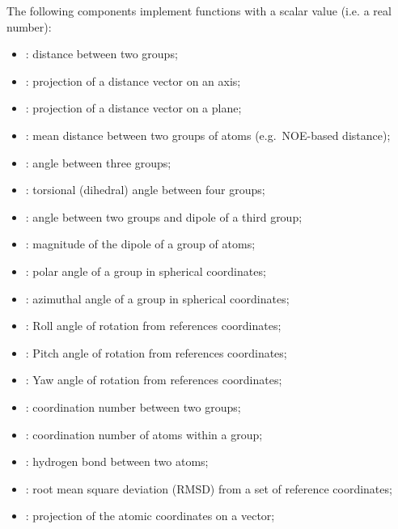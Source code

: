 The following components implement functions with a scalar value (i.e.{} a real number):
\begin{itemize}
\item {}: distance between two groups;
\item {}: projection of a distance vector on an axis;
\item {}: projection of a distance vector on a plane;
\item {}: mean distance between two groups of atoms (e.g.~NOE-based distance);
\item {}: angle between three groups;
\item {}: torsional (dihedral) angle between four groups;
\item {}: angle between two groups and dipole of a third group;
\item {}: magnitude of the dipole of a group of atoms;
\item {}: polar angle of a group in spherical coordinates;
\item {}: azimuthal angle of a group in spherical coordinates;
\item {}: Roll angle of rotation from references coordinates;
\item {}: Pitch angle of rotation from references coordinates;
\item {}: Yaw angle of rotation from references coordinates;
\item {}: coordination number between two groups;
\item {}: coordination number of atoms within a
  group;
\item {}: hydrogen bond between two atoms;
\item {}: root mean square deviation (RMSD) from a set of
  reference coordinates;
\item {}: projection of the atomic coordinates on a
  vector;
\ifdefined{}\fi

\end{itemize}
